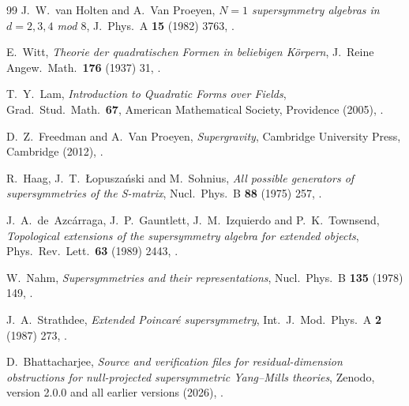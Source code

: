 \begin{thebibliography}{99}
J.~W.~van Holten and A.~Van Proeyen, \textit{$N=1$ supersymmetry algebras in $d=2,3,4$ mod $8$}, J.\ Phys.\ A \textbf{15} (1982) 3763, .

E.~Witt, \textit{Theorie der quadratischen Formen in beliebigen K\"orpern}, J.\ Reine Angew.\ Math.\ \textbf{176} (1937) 31, .

T.~Y.~Lam, \textit{Introduction to Quadratic Forms over Fields}, Grad.\ Stud.\ Math.\ \textbf{67}, American Mathematical Society, Providence (2005), .

D.~Z.~Freedman and A.~Van Proeyen, \textit{Supergravity}, Cambridge University Press, Cambridge (2012), .

R.~Haag, J.~T.~{\L}opusza\'nski and M.~Sohnius, \textit{All possible generators of supersymmetries of the S-matrix}, Nucl.\ Phys.\ B \textbf{88} (1975) 257, .

J.~A.~de~Azc\'arraga, J.~P.~Gauntlett, J.~M.~Izquierdo and P.~K.~Townsend, \textit{Topological extensions of the supersymmetry algebra for extended objects}, Phys.\ Rev.\ Lett.\ \textbf{63} (1989) 2443, .

W.~Nahm, \textit{Supersymmetries and their representations}, Nucl.\ Phys.\ B \textbf{135} (1978) 149, .

J.~A.~Strathdee, \textit{Extended Poincar\'e supersymmetry}, Int.\ J.\ Mod.\ Phys.\ A \textbf{2} (1987) 273, .

D.~Bhattacharjee, \emph{Source and verification files for residual-dimension
obstructions for null-projected supersymmetric Yang--Mills theories},
Zenodo, version 2.0.0 and all earlier versions (2026), .


\end{thebibliography}
